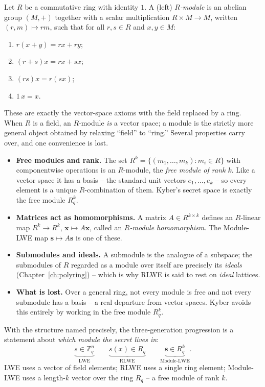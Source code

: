 \begin{definition}
Let $R$ be a commutative ring with identity $1$. A (left) \emph{$R$-module} is an abelian group $(M,+)$ together with a scalar multiplication $R\times M\to M$, written $(r,m)\mapsto rm$, such that for all $r,s\in R$ and $x,y\in M$:
\begin{enumerate}
  \item $r(x+y)=rx+ry$;
  \item $(r+s)x=rx+sx$;
  \item $(rs)x=r(sx)$;
  \item $1\,x=x$.
\end{enumerate}
\end{definition}

These are exactly the vector-space axioms with the field replaced by a ring. When $R$ is a field, an $R$-module \emph{is} a vector space; a module is the strictly more general object obtained by relaxing ``field'' to ``ring.'' Several properties carry over, and one convenience is lost.

\begin{itemize}
  \item \textbf{Free modules and rank.} The set $R^{k}=\{(m_1,\dots,m_k):m_i\in R\}$ with componentwise operations is an $R$-module, the \emph{free module of rank $k$}. Like a vector space it has a basis -- the standard unit vectors $e_1,\dots,e_k$ -- so every element is a unique $R$-combination of them. Kyber's secret space is exactly the free module $R_q^{k}$.
  \item \textbf{Matrices act as homomorphisms.} A matrix $A\in R^{k\times k}$ defines an $R$-linear map $R^{k}\to R^{k}$, $\mathbf{x}\mapsto A\mathbf{x}$, called an \emph{$R$-module homomorphism}. The Module-LWE map $\mathbf{s}\mapsto A\mathbf{s}$ is one of these.
  \item \textbf{Submodules and ideals.} A submodule is the analogue of a subspace; the submodules of $R$ regarded as a module over itself are precisely its \emph{ideals} (Chapter~\ref{ch:polyring}) -- which is why RLWE is said to rest on \emph{ideal} lattices.
  \item \textbf{What is lost.} Over a general ring, not every module is free and not every submodule has a basis -- a real departure from vector spaces. Kyber avoids this entirely by working in the free module $R_q^{k}$.
\end{itemize}

With the structure named precisely, the three-generation progression is a statement about \emph{which module the secret lives in}:
\[
\underbrace{s\in\mathbb{Z}_q^{n}}_{\text{LWE}}
\qquad
\underbrace{s(x)\in R_q}_{\text{RLWE}}
\qquad
\underbrace{\mathbf{s}\in R_q^{k}}_{\text{Module-LWE}}.
\]
LWE uses a vector of field elements; RLWE uses a single ring element; Module-LWE uses a length-$k$ vector over the ring $R_q$ -- a free module of rank $k$.

